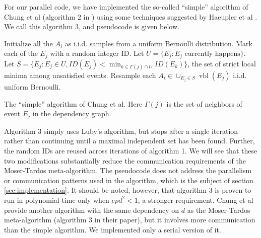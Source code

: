 \documentclass[twocolumn]{article}
\newcommand{\ksat}{\texttt{k-SAT}~}
\begin{document}
For our parallel code, we have implemented the so-called ``simple'' algorithm of Chung et al (algorithm 2 in \cite{chung2014distributed}) using some techniques suggested by Haeupler et al \cite{haeupler2011new}.  We call this algorithm 3, and pseudocode is given below.

\begin{algorithm}[H]
\label{alg:chung-simple}
\begin{algorithmic}
\State Initialize all the $A_i$ as i.i.d. samples from a uniform Bernoulli distribution.
\State Mark each of the $E_j$ with a random integer ID.
  \State Let $U = \{E_j: E_j\text{ currently happens}\}$. 
  \State Let $S = \{E_j: E_j \in U, ID(E_j) < \min_{k \in \Gamma(j) \cap U} ID(E_k)\}$, the set of strict local minima among unsatisfied events.
  \State Resample each $A_i \in \cup_{E_j \in S} \operatorname{vbl}(E_j)$ i.i.d. uniform Bernoulli.
\EndWhile
\end{algorithmic}
\caption{The ``simple'' algorithm of Chung et al.  Here $\Gamma(j)$ is the set of neighbors of event $E_j$ in the dependency graph.}
\end{algorithm}

Algorithm 3 simply uses Luby's algorithm, but stops after a single iteration rather than continuing until a maximal independent set has been found.  Further, the random IDs are reused across iterations of algorithm 1.  We will see that these two modifications substantially reduce the communication requirements of the Moser-Tardos meta-algorithm.  The pseudocode does not address the parallelism or communication patterns used in the algorithm, which is the subject of section \ref{sec:implementation}.  It should be noted, however, that algorithm 3 is proven to run in polynomial time only when $e p d^2 < 1$, a stronger requirement.  Chung et al provide another algorithm with the same dependency on $d$ as the Moser-Tardos meta-algorithm (algorithm 3 in their paper), but it involves more communication than the simple algorithm.  We implemented only a serial version of it.

\end{document}

